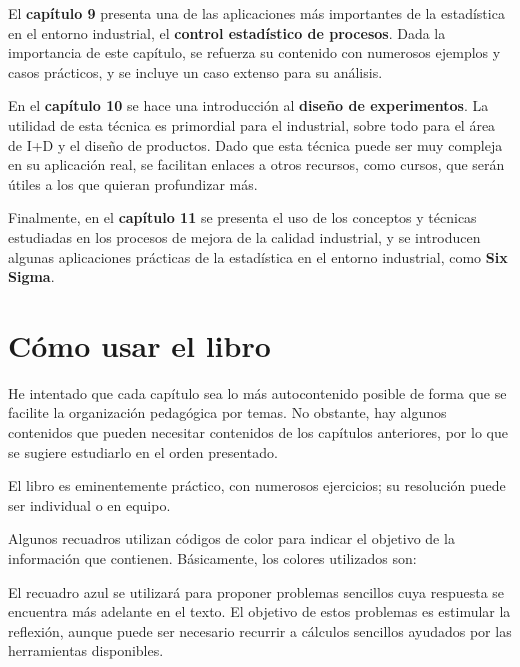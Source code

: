 \documentclass[
  letterpaper,
  DIV=11,
  numbers=noendperiod,
  oneside]{scrreprt}
\begin{document}
El \textbf{capítulo 9} presenta una de las aplicaciones más importantes
de la estadística en el entorno industrial, el \textbf{control
estadístico de procesos}. Dada la importancia de este capítulo, se
refuerza su contenido con numerosos ejemplos y casos prácticos, y se
incluye un caso extenso para su análisis.

En el \textbf{capítulo 10} se hace una introducción al \textbf{diseño de
experimentos}. La utilidad de esta técnica es primordial para el
industrial, sobre todo para el área de I+D y el diseño de productos.
Dado que esta técnica puede ser muy compleja en su aplicación real, se
facilitan enlaces a otros recursos, como cursos, que serán útiles a los
que quieran profundizar más.

Finalmente, en el \textbf{capítulo 11} se presenta el uso de los
conceptos y técnicas estudiadas en los procesos de mejora de la calidad
industrial, y se introducen algunas aplicaciones prácticas de la
estadística en el entorno industrial, como \textbf{Six Sigma}.

\hypertarget{cuxf3mo-usar-el-libro}{%
\section*{Cómo usar el libro}\label{cuxf3mo-usar-el-libro}}


He intentado que cada capítulo sea lo más autocontenido posible de forma
que se facilite la organización pedagógica por temas. No obstante, hay
algunos contenidos que pueden necesitar contenidos de los capítulos
anteriores, por lo que se sugiere estudiarlo en el orden presentado.

El libro es eminentemente práctico, con numerosos ejercicios; su
resolución puede ser individual o en equipo.

Algunos recuadros utilizan códigos de color para indicar el objetivo de
la información que contienen. Básicamente, los colores utilizados son:

\begin{tcolorbox}[enhanced jigsaw, colback=white, opacitybacktitle=0.6, leftrule=.75mm, opacityback=0, coltitle=black, colframe=quarto-callout-note-color-frame, colbacktitle=quarto-callout-note-color!10!white, bottomrule=.15mm, title={Problema o cuestión a resolver}, bottomtitle=1mm, toptitle=1mm, breakable, left=2mm, arc=.35mm, titlerule=0mm, rightrule=.15mm, toprule=.15mm]

El recuadro azul se utilizará para proponer problemas sencillos cuya
respuesta se encuentra más adelante en el texto. El objetivo de estos
problemas es estimular la reflexión, aunque puede ser necesario recurrir
a cálculos sencillos ayudados por las herramientas disponibles.

\end{tcolorbox}
\end{document}
